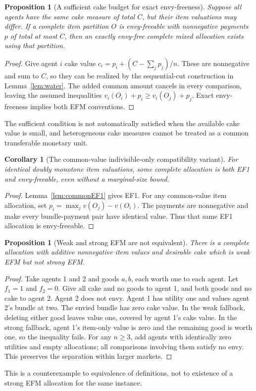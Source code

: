 \documentclass[11pt,a4paper]{article}
\newtheorem{proposition}[theorem]{Proposition}
\newtheorem{corollary}[theorem]{Corollary}
\theoremstyle{remark}\newtheorem{remark}[theorem]{Remark}
\begin{document}
\begin{proposition}[A sufficient cake budget for exact envy-freeness]\label{prop:paymentsCake}
Suppose all agents have the same cake measure of total $C$, but their item valuations may differ. If a complete item partition $O$ is envy-freeable with nonnegative payments $p$ of total at most $C$, then an exactly envy-free complete mixed allocation exists using that partition.
\end{proposition}
\begin{proof}
Give agent $i$ cake value $c_i=p_i+(C-\sum_jp_j)/n$. These are nonnegative and sum to $C$, so they can be realized by the sequential-cut construction in Lemma~\ref{lem:water}. The added common amount cancels in every comparison, leaving the assumed inequalities $v_i(O_i)+p_i\ge v_i(O_j)+p_j$. Exact envy-freeness implies both EFM conventions.
\end{proof}
The sufficient condition is not automatically satisfied when the available cake value is small, and heterogeneous cake measures cannot be treated as a common transferable monetary unit.

\begin{corollary}[The common-value indivisible-only compatibility variant]
For identical doubly monotone item valuations, some complete allocation is both EF1 and envy-freeable, even without a marginal-size bound.
\end{corollary}
\begin{proof}
Lemma~\ref{lem:commonEF1} gives EF1. For any common-value item allocation, set $p_i=\max_jv(O_j)-v(O_i)$. The payments are nonnegative and make every bundle-payment pair have identical value. Thus that same EF1 allocation is envy-freeable.
\end{proof}

\begin{proposition}[Weak and strong EFM are not equivalent]\label{prop:definitions}
There is a complete allocation with additive nonnegative item values and desirable cake which is weak EFM but not strong EFM.
\end{proposition}
\begin{proof}
Take agents 1 and 2 and goods $a,b$, each worth one to each agent. Let $f_1=1$ and $f_2=0$. Give all cake and no goods to agent 1, and both goods and no cake to agent 2. Agent 2 does not envy. Agent 1 has utility one and values agent 2's bundle at two. The envied bundle has zero cake value. In the weak fallback, deleting either good leaves value one, covered by agent 1's cake value. In the strong fallback, agent 1's item-only value is zero and the remaining good is worth one, so the inequality fails. For any $n\ge3$, add agents with identically zero utilities and empty allocations; all comparisons involving them satisfy no envy. This preserves the separation within larger markets.
\end{proof}
This is a counterexample to equivalence of definitions, not to existence of a strong EFM allocation for the same instance.
\end{document}
